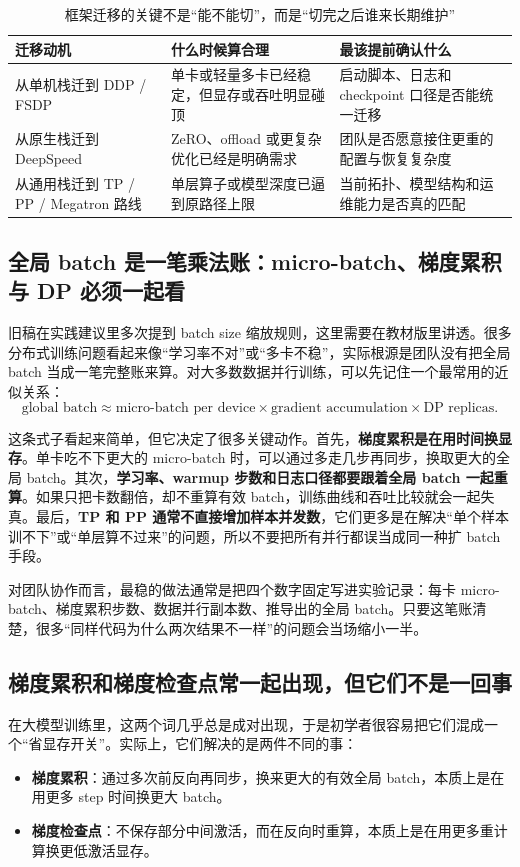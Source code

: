 \begin{table}[H]
\centering
\small
\begin{tabularx}{\textwidth}{>{\raggedright\arraybackslash}p{3cm}>{\raggedright\arraybackslash}p{3cm}>{\raggedright\arraybackslash}X}
\toprule
\textbf{迁移动机} & \textbf{什么时候算合理} & \textbf{最该提前确认什么} \\
\midrule
从单机栈迁到 DDP / FSDP & 单卡或轻量多卡已经稳定，但显存或吞吐明显碰顶 & 启动脚本、日志和 checkpoint 口径是否能统一迁移 \\
从原生栈迁到 DeepSpeed & ZeRO、offload 或更复杂优化已经是明确需求 & 团队是否愿意接住更重的配置与恢复复杂度 \\
从通用栈迁到 TP / PP / Megatron 路线 & 单层算子或模型深度已逼到原路径上限 & 当前拓扑、模型结构和运维能力是否真的匹配 \\
\bottomrule
\end{tabularx}
\caption{框架迁移的关键不是“能不能切”，而是“切完之后谁来长期维护”}
\label{tab:framework-migration-cost}
\end{table}

\subsection{全局 batch 是一笔乘法账：micro-batch、梯度累积与 DP 必须一起看}
旧稿在实践建议里多次提到 batch size 缩放规则，这里需要在教材版里讲透。很多分布式训练问题看起来像“学习率不对”或“多卡不稳”，实际根源是团队没有把全局 batch 当成一笔完整账来算。对大多数数据并行训练，可以先记住一个最常用的近似关系：
\[
\text{global batch} \approx \text{micro-batch per device} \times \text{gradient accumulation} \times \text{DP replicas}.
\]

这条式子看起来简单，但它决定了很多关键动作。首先，\textbf{梯度累积是在用时间换显存}。单卡吃不下更大的 micro-batch 时，可以通过多走几步再同步，换取更大的全局 batch。其次，\textbf{学习率、warmup 步数和日志口径都要跟着全局 batch 一起重算}。如果只把卡数翻倍，却不重算有效 batch，训练曲线和吞吐比较就会一起失真。最后，\textbf{TP 和 PP 通常不直接增加样本并发数}，它们更多是在解决“单个样本训不下”或“单层算不过来”的问题，所以不要把所有并行都误当成同一种扩 batch 手段。

对团队协作而言，最稳的做法通常是把四个数字固定写进实验记录：每卡 micro-batch、梯度累积步数、数据并行副本数、推导出的全局 batch。只要这笔账清楚，很多“同样代码为什么两次结果不一样”的问题会当场缩小一半。

\subsection{梯度累积和梯度检查点常一起出现，但它们不是一回事}
在大模型训练里，这两个词几乎总是成对出现，于是初学者很容易把它们混成一个“省显存开关”。实际上，它们解决的是两件不同的事：
\begin{itemize}
  \item \textbf{梯度累积}：通过多次前反向再同步，换来更大的有效全局 batch，本质上是在用更多 step 时间换更大 batch。
  \item \textbf{梯度检查点}：不保存部分中间激活，而在反向时重算，本质上是在用更多重计算换更低激活显存。
\end{itemize}

